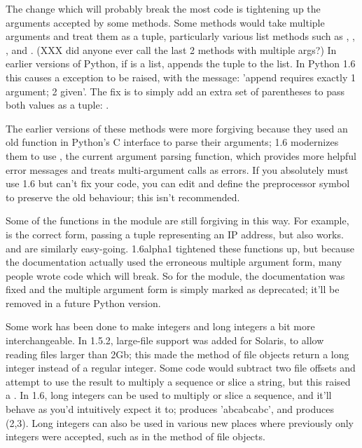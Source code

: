 \documentclass{howto}
\begin{document}
{The change which will probably break the most code is tightening up
the arguments accepted by some methods.  Some methods would take
multiple arguments and treat them as a tuple, particularly various
list methods such as , ,
, and .
(XXX did anyone ever call the last 2 methods with multiple args?)
In earlier versions of Python, if  is a list,  appends the tuple  to the list.  In Python 1.6 this
causes a  exception to be raised, with the
message: 'append requires exactly 1 argument; 2 given'.  The fix is to
simply add an extra set of parentheses to pass both values as a tuple: 
.

The earlier versions of these methods were more forgiving because they
used an old function in Python's C interface to parse their arguments;
1.6 modernizes them to use , the current
argument parsing function, which provides more helpful error messages
and treats multi-argument calls as errors.  If you absolutely must use
1.6 but can't fix your code, you can edit 
and define the preprocessor symbol  to
preserve the old behaviour; this isn't recommended.

Some of the functions in the  module are still
forgiving in this way.  For example,  is the correct form, passing a tuple representing
an IP address, but
 also
works.  and  are
similarly easy-going.  1.6alpha1 tightened these functions up, but
because the documentation actually used the erroneous multiple
argument form, many people wrote code which will break.  So for
the module, the documentation was fixed and the
multiple argument form is simply marked as deprecated; it'll be
removed in a future Python version.  

Some work has been done to make integers and long integers a bit more
interchangeable.  In 1.5.2, large-file support was added for Solaris,
to allow reading files larger than 2Gb; this made the 
method of file objects return a long integer instead of a regular
integer.  Some code would subtract two file offsets and attempt to use
the result to multiply a sequence or slice a string, but this raised a
.   In 1.6, long integers can be used to multiply
or slice a sequence, and it'll behave as you'd intuitively expect it to; 
 produces 'abcabcabc', and 
 produces (2,3). Long integers can also be
used in various new places where previously only integers were
accepted, such as in the  method of file objects.

}
\end{document}
